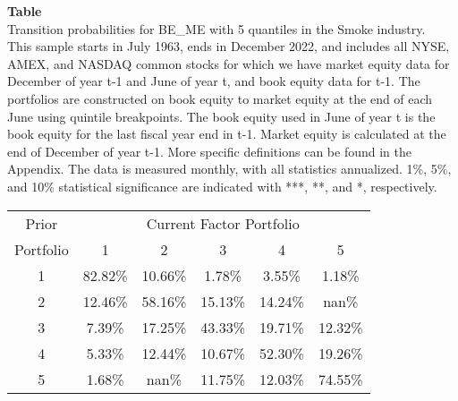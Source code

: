 \begin{table*}[ht!]
\raggedright
{}
\label{tab: transition_probs_BE_ME_Smoke_with_5_quantiles}
\textbf{Table \thetable} \\
Transition probabilities for BE_ME with 5 quantiles in the Smoke industry. \\
\hspace*{1em}This sample starts in July 1963, ends in December 2022, and includes all NYSE, AMEX, and NASDAQ common stocks for which we have market equity data for December of year t-1 and June of year t, and book equity data for t-1. The portfolios are constructed on book equity to market equity at the end of each June using quintile breakpoints.  The book equity used in June of year t is the book equity for the last fiscal year end in t-1.  Market equity is calculated at the end of December of year t-1.  More specific definitions can be found in the Appendix.  The data is measured monthly, with all statistics annualized.  1\%, 5\%, and 10\% statistical significance are indicated with ***, **, and *, respectively. \\
\vspace{0.5em}
\centering
\begin{adjustbox}{max width=\textwidth}
\begin{tabular}{@{}cccccc@{}}
\toprule
Prior & \multicolumn{5}{c}{Current Factor Portfolio} \\
Portfolio & 1 & 2 & 3 & 4 & 5 \\
\midrule
1 & 82.82\% & 10.66\% & 1.78\% & 3.55\% & 1.18\% \\
2 & 12.46\% & 58.16\% & 15.13\% & 14.24\% & nan\% \\
3 & 7.39\% & 17.25\% & 43.33\% & 19.71\% & 12.32\% \\
4 & 5.33\% & 12.44\% & 10.67\% & 52.30\% & 19.26\% \\
5 & 1.68\% & nan\% & 11.75\% & 12.03\% & 74.55\% \\
\bottomrule
\end{tabular}
\end{adjustbox}
\end{table*}